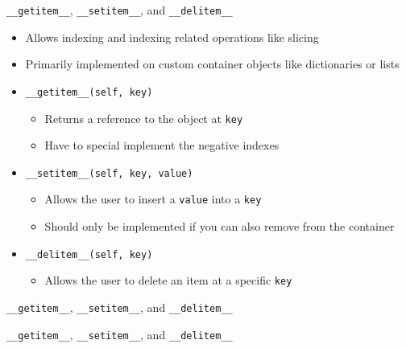 \documentclass[aspectratio=169,xcolor=dvipsnames]{beamer}
\begin{document}
\begin{frame}{\texttt{\_\_getitem\_\_}, \texttt{\_\_setitem\_\_}, and \texttt{\_\_delitem\_\_}}
  \begin{itemize}
    \item Allows indexing and indexing related operations like slicing
    \item Primarily implemented on custom container objects like dictionaries or lists
    \item \texttt{\_\_getitem\_\_(self, key)}
      \begin{itemize}
        \item Returns a reference to the object at \texttt{key}
        \item Have to special implement the negative indexes
      \end{itemize}
    \item \texttt{\_\_setitem\_\_(self, key, value)}
      \begin{itemize}
        \item Allows the user to insert a \texttt{value} into a \texttt{key}
        \item Should only be implemented if you can also remove from the container
      \end{itemize}
    \item \texttt{\_\_delitem\_\_(self, key)}
      \begin{itemize}
        \item Allows the user to delete an item at a specific \texttt{key}
      \end{itemize}
  \end{itemize}
\end{frame}


\begin{frame}{\texttt{\_\_getitem\_\_}, \texttt{\_\_setitem\_\_}, and \texttt{\_\_delitem\_\_}}
  \begin{example}
    
  \end{example}
\end{frame}


\begin{frame}{\texttt{\_\_getitem\_\_}, \texttt{\_\_setitem\_\_}, and \texttt{\_\_delitem\_\_}}
  \begin{example}
    
  \end{example}
\end{frame}
\end{document}
